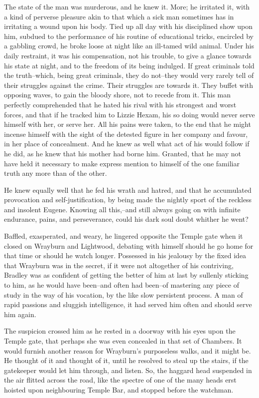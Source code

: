 The state of the man was murderous, and he knew it. More; he irritated
it, with a kind of perverse pleasure akin to that which a sick man
sometimes has in irritating a wound upon his body. Tied up all day with
his disciplined show upon him, subdued to the performance of his routine
of educational tricks, encircled by a gabbling crowd, he broke loose at
night like an ill-tamed wild animal. Under his daily restraint, it was
his compensation, not his trouble, to give a glance towards his state at
night, and to the freedom of its being indulged. If great criminals told
the truth--which, being great criminals, they do not--they would very
rarely tell of their struggles against the crime. Their struggles are
towards it. They buffet with opposing waves, to gain the bloody shore,
not to recede from it. This man perfectly comprehended that he hated his
rival with his strongest and worst forces, and that if he tracked him to
Lizzie Hexam, his so doing would never serve himself with her, or serve
her. All his pains were taken, to the end that he might incense himself
with the sight of the detested figure in her company and favour, in her
place of concealment. And he knew as well what act of his would follow
if he did, as he knew that his mother had borne him. Granted, that he
may not have held it necessary to make express mention to himself of the
one familiar truth any more than of the other.

He knew equally well that he fed his wrath and hatred, and that he
accumulated provocation and self-justification, by being made the
nightly sport of the reckless and insolent Eugene. Knowing all
this,--and still always going on with infinite endurance, pains, and
perseverance, could his dark soul doubt whither he went?

Baffled, exasperated, and weary, he lingered opposite the Temple gate
when it closed on Wrayburn and Lightwood, debating with himself should
he go home for that time or should he watch longer. Possessed in his
jealousy by the fixed idea that Wrayburn was in the secret, if it were
not altogether of his contriving, Bradley was as confident of getting
the better of him at last by sullenly sticking to him, as he would have
been--and often had been--of mastering any piece of study in the way
of his vocation, by the like slow persistent process. A man of rapid
passions and sluggish intelligence, it had served him often and should
serve him again.

The suspicion crossed him as he rested in a doorway with his eyes upon
the Temple gate, that perhaps she was even concealed in that set of
Chambers. It would furnish another reason for Wrayburn’s purposeless
walks, and it might be. He thought of it and thought of it, until
he resolved to steal up the stairs, if the gatekeeper would let him
through, and listen. So, the haggard head suspended in the air flitted
across the road, like the spectre of one of the many heads erst hoisted
upon neighbouring Temple Bar, and stopped before the watchman.

